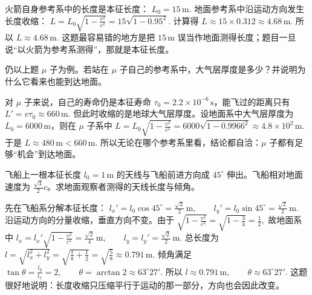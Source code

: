 \documentclass[lang=cn,11pt]{elegantbook}
\begin{document}
\begin{solution}
火箭自身参考系中的长度是本征长度：
 \(L_0=15\,\mathrm{m}.\) 
地面参考系中沿运动方向发生长度收缩：
 \(L=L_0\sqrt{1-\frac{v^2}{c^2}} =15\sqrt{1-0.95^2}.\) 
计算得
 \(L\approx 15\times 0.312 \approx 4.68\,\mathrm{m}.\) 
所以
 \(\boxed{L\approx 4.68\,\mathrm{m}.}\) 
这题最容易错的地方是把 \(15\,\mathrm{m}\) 误当作地面测得长度；题目一旦说“以火箭为参考系测得”，那就是本征长度。
\end{solution}

\begin{exercise}[\(\mu\) 子自己眼中的大气层有多厚]
仍以上题 \(\mu\) 子为例。若站在 \(\mu\) 子自己的参考系中，大气层厚度是多少？并说明为什么它看来也能到达地面。
\end{exercise}

\begin{solution}
对 \(\mu\) 子来说，自己的寿命仍是本征寿命 \(\tau_0=2.2\times 10^{-6}\,\mathrm{s}\)，能飞过的距离只有
 \(L'=v\tau_0\approx 660\,\mathrm{m}.\) 
但此时收缩的是地球大气层厚度。设地面系中大气层厚度为 \(L_0=6000\,\mathrm{m}\)，则在 \(\mu\) 子系中
 \(L=L_0\sqrt{1-\frac{v^2}{c^2}} =6000\sqrt{1-0.9966^2} \approx 4.8\times 10^2\,\mathrm{m}.\) 
于是
 \(\boxed{L\approx 480\,\mathrm{m}<660\,\mathrm{m}}.\) 
所以无论在哪个参考系里看，结论都自洽：\(\mu\) 子都有足够“机会”到达地面。
\end{solution}

\begin{exercise}
飞船上一根本征长度 \(l_0=1\,\mathrm{m}\) 的天线与飞船前进方向成 \(45^\circ\) 伸出。飞船相对地面速度为 \(\frac{\sqrt3}{2}c\)。求地面观察者测得的天线长度与倾角。
\end{exercise}

\begin{solution}
先在飞船系分解本征长度：
 \(l_x'=l_0\cos45^\circ=\frac{\sqrt2}{2}\,\mathrm{m}, \qquad l_y'=l_0\sin45^\circ=\frac{\sqrt2}{2}\,\mathrm{m}.\) 
沿运动方向的分量收缩，垂直方向不变。由于
 \(\sqrt{1-\frac{v^2}{c^2}} =\sqrt{1-\frac34} =\frac12,\) 
故地面系中
 \(l_x=l_x'\sqrt{1-\frac{v^2}{c^2}} =\frac{\sqrt2}{4}\,\mathrm{m}, \qquad l_y=l_y'=\frac{\sqrt2}{2}\,\mathrm{m}.\) 
总长度为
 \(l=\sqrt{l_x^2+l_y^2} =\sqrt{\frac18+\frac12} =\sqrt{\frac58} \approx 0.791\,\mathrm{m}.\) 
倾角满足
 \(\tan\theta=\frac{l_y}{l_x}=2, \qquad \theta=\arctan 2\approx 63^\circ 27'.\) 
所以
 \(\boxed{l\approx 0.791\,\mathrm{m},\qquad \theta\approx 63^\circ 27'.}\) 
这题很好地说明：长度收缩只压缩平行于运动的那一部分，方向也会因此改变。
\end{solution}
\end{document}
